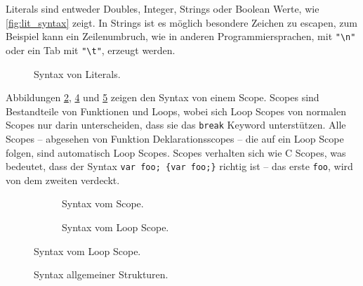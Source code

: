       Literals sind entweder Doubles, Integer, Strings oder Boolean Werte, wie \autoref{fig:lit_syntax} zeigt. In Strings ist es möglich besondere Zeichen zu escapen, zum Beispiel kann ein Zeilenumbruch, wie in anderen Programmiersprachen, mit \lstinline[style=MyMacroStyle]$"\n"$ oder ein Tab mit \lstinline[style=MyMacroStyle]$"\t"$, erzeugt werden.
      \begin{figure}[H]
        \centering
        \caption{Syntax von Literals.}
        \label{fig:lit_syntax}
      \end{figure}

      Abbildungen \ref{fig:scope_syntax}, \ref{fig:loop_scope_syntax} und \ref{fig:common_syntax} zeigen den Syntax von einem Scope. Scopes sind Bestandteile von Funktionen und Loops, wobei sich Loop Scopes von normalen Scopes nur darin unterscheiden, dass sie das \lstinline[style=MyMacroStyle]$break$ Keyword unterstützen. Alle Scopes -- abgesehen von Funktion Deklarationsscopes -- die auf ein Loop Scope folgen, sind automatisch Loop Scopes. Scopes verhalten sich wie C Scopes, was bedeutet, dass der Syntax \lstinline[style=MyMacroStyle]$var foo; {var foo;}$ richtig ist -- das erste \lstinline[style=MyMacroStyle]$foo$, wird von dem zweiten verdeckt.
      \begin{figure}[H]
        \centering
        \begin{minipage}{.45\textwidth}
          \vspace*{2.45em}
          \begin{figure}[H]
            \centering
            \caption{Syntax vom Scope.}
            \label{fig:scope_syntax}
          \end{figure}
        \end{minipage}%
        \begin{minipage}{.45\textwidth}
          \begin{figure}[H]
            \centering
            \caption{Syntax vom Loop Scope.}
            \label{fig:loop_scope_syntax}
          \end{figure}
        \end{minipage}
      \end{figure}

      \begin{figure}[H]
        \centering
        \caption{Syntax allgemeiner Strukturen.}
        \label{fig:common_syntax}
      \end{figure}


